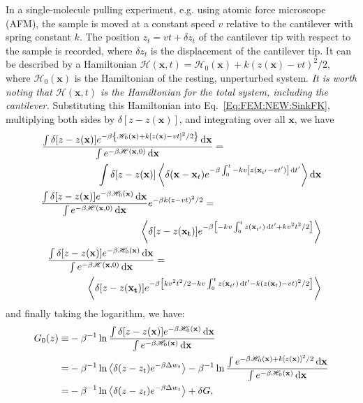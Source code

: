 In a single-molecule pulling experiment, e.g. using atomic force microscope (AFM), the sample is moved at a constant speed $v$ relative to the cantilever with spring constant $k$. The position $z_t=vt+\delta z_t$ of the cantilever tip with respect to the sample is recorded, where $\delta z_t$ is the displacement of the cantilever tip. It can be described by a Hamiltonian $\mathscr{H}(\mathbf{x},t)=\mathscr{H}_0(\mathbf{x})+k(z(\mathbf{x})-vt)^2/2$, where $\mathscr{H}_0(\mathbf{x})$ is the Hamiltonian of the resting, unperturbed system. \textit{It is worth noting that $\mathscr{H}(\mathbf{x},t)$ is the Hamiltonian for the total system, including the cantilever.} Substituting this Hamiltonian into Eq.~\ref{Eq:FEM:NEW:SinkFK}, multiplying both sides by $\delta[z-z(\mathbf{x})]$, and integrating over all $\mathbf{x}$, we have
\begin{align}
	\frac{\int\delta[z-z(\mathbf{x})]e^{-\beta \left\{\mathscr{H}_0(\mathbf{x})+k[z(\mathbf{x})-vt]^2/2\right\}}\diff \mathbf{x}}{\int e^{-\beta \mathscr{H}(\mathbf{x},0)}\diff \mathbf{x}}=\qquad\qquad\qquad\qquad\qquad&\notag\\
	\int \delta[z-z(\mathbf{x})] \left\langle \delta(\mathbf{x}-\mathbf{x}_t)e^{-\beta\int_0^t -kv\left[z(\mathbf{x}_{t^\prime}-vt^\prime)\right] \diff t^\prime}\right\rangle \diff \mathbf{x}\notag\\
	\frac{\int\delta[z-z(\mathbf{x})]e^{-\beta \mathscr{H}_0(\mathbf{x})}\diff \mathbf{x}}{\int e^{-\beta \mathscr{H}(\mathbf{x},0)}\diff \mathbf{x}}e^{-\beta k(z-vt)^2/2}=\qquad\qquad\qquad\qquad\qquad\quad&\notag\\
	\left\langle \delta[z-z(\mathbf{x_{t}})] e^{-\beta \left[-kv\int_0^t z(\mathbf{x}_{t^\prime})\diff t^\prime+kv^2t^2/2\right]}\right\rangle\notag\\
	\frac{\int\delta[z-z(\mathbf{x})]e^{-\beta \mathscr{H}_0(\mathbf{x})}\diff \mathbf{x}}{\int e^{-\beta \mathscr{H}(\mathbf{x},0)}\diff \mathbf{x}}=\qquad\qquad\qquad\qquad\qquad\qquad\qquad\qquad&\notag\\
	\left\langle \delta[z-z(\mathbf{x_{t}})] e^{-\beta \left[kv^2t^2/2-kv\int_0^t z(\mathbf{x}_{t^\prime})\diff t^\prime-k(z(\mathbf{x}_t)-vt)^2/2\right]}\right\rangle
\end{align}
and finally taking the logarithm, we have:
\begin{align}
	G_0(z)\equiv&-\beta^{-1}\ln{\frac{\int\delta[z-z(\mathbf{x})]e^{-\beta \mathscr{H}_0(\mathbf{x})}\mathop{}\!\mathrm{d}\mathbf{x}}{\int e^{-\beta \mathscr{H}_0(\mathbf{x})}\mathop{}\!\mathrm{d}\mathbf{x}}}\notag\\
	      =&-\beta^{-1}\ln{\left<\delta(z-z_t)e^{-\beta \Delta w_t}\right>}-\beta^{-1}\ln{\frac{\int e^{-\beta \mathscr{H}_0(\mathbf{x})+k[z(\mathbf{x})]^2/2}\mathop{}\!\mathrm{d}\mathbf{x}}{\int e^{-\beta \mathscr{H}_0(\mathbf{x})}\mathop{}\!\mathrm{d}\mathbf{x}}}\notag\\
	      =&-\beta^{-1}\ln{\left<\delta(z-z_t)e^{-\beta \Delta w_t}\right>}+\delta G,
\end{align}
